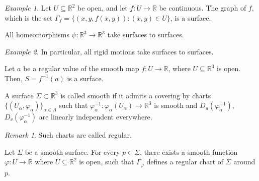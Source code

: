 \documentclass[11pt]{article}
\newcommand{\R}{\mathbb{R}}
\theoremstyle{definition}
\theoremstyle{remark}
\newtheorem*{remark}{Remark}
\newtheorem*{example}{Example}
\numberwithin{equation}{section}
\begin{document}
    \begin{example}
        Let $U\subseteq \R^2$ be open, and let $f\colon U \to \R$ be continuous. The
        graph of $f$, which is the set $\Gamma_f = \{(x, y, f(x, y)): (x, y) \in
        U\}$, is a surface.
    \end{example}

    \begin{lemma}
        All homeomorphisms $\psi\colon \R^3 \to \R^3$ take surfaces to surfaces.
    \end{lemma}
    \begin{example}
        In particular, all rigid motions take surfaces to surfaces.
    \end{example}

    \begin{theorem}
        Let $a$ be a regular value of the smooth map $f\colon U \to \R$, where
        $U\subseteq \R^3$ is open. Then, $S = f^{-1}(a)$ is a surface.
    \end{theorem}

    \begin{definition}
        A surface $\Sigma \subset \R^3$ is called smooth if it admits a covering by
        charts $\{(U_\alpha, \varphi_\alpha)\}_{\alpha \in \Lambda}$ such that
        $\varphi_\alpha^{-1}\colon \varphi_\alpha(U_\alpha) \to \R^3$ is smooth and
        $D_u(\varphi_\alpha^{-1})$, $D_v(\varphi_\alpha^{-1})$ are linearly
        independent everywhere.
        \begin{remark}
            Such charts are called regular.
        \end{remark}
    \end{definition}

    \begin{lemma}
        Let $\Sigma$ be a smooth surface. For every $p \in \Sigma$, there exists a
        smooth function $\varphi\colon U \to \R$ where $U\subseteq \R^2$ is open,
        such that $\Gamma_\varphi$ defines a regular chart of $\Sigma$ around $p$.
    \end{lemma}
    
    
\end{document}

